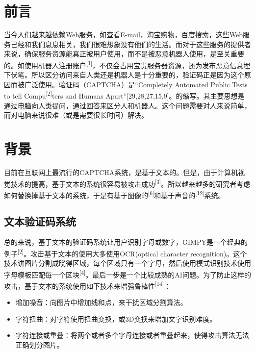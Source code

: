 \documentclass[bachelor,zhspacing]{cqu}  %
\begin{document}


\section{前言}\label{ux524dux8a00}

当今人们越来越依赖Web服务，如查看E-mail，淘宝购物，百度搜索，这些Web服务已经和我们息息相关，我们很难想象没有他们的生活。而对于这些服务的提供者来说，确保服务资源能真正被用户使用，而不是被恶意机器人使用，是至关重要的。如使用机器人注册账户\textsuperscript{{[}1{]}}，不仅会占用宝贵服务器资源，还为发布恶意信息埋下伏笔。所以区分访问来自人类还是机器人是十分重要的，验证码正是因为这个原因而被广泛使用。验证码（CAPTCHA）是``Completely
Automated Public Tests to tell Compu\textsuperscript{{[}2{]}}ters and
Humans
Apart''{[}29,28,27,15,9{]}。的缩写。其主要思想是通过电脑向人类提问，通过回答来区分人和机器人。这个问题需要对人来说简单，而对电脑来说很难（或是需要很长时间）解决。

\section{背景}\label{ux80ccux666f}

目前在互联网上最流行的CAPTCHA系统，是基于文本的。但是，由于计算机视觉技术的提高，基于文本的系统很容易被攻击成功\textsuperscript{{[}3{]}}。所以越来越多的研究者考虑如何替换掉基于文本的系统，于是有基于图像的\textsuperscript{{[}6{]}}和基于声音的\textsuperscript{{[}12{]}}系统。

\subsection{文本验证码系统}\label{ux6587ux672cux9a8cux8bc1ux7801ux7cfbux7edf}

总的来说，基于文本的验证码系统让用户识别字母或数字，GIMPY是一个经典的例子\textsuperscript{{[}2{]}}。攻击基于文本的使用大多使用OCR(optical
character
recognition)。这个技术讲图片分割成晓得区域，每个区域只有一个字母，然后使用模式识别技术使用字母模板匹配每一个区块\textsuperscript{{[}4{]}}。最后一步是一个比较成熟的AI问题。为了防止这样的攻击，基于文本的系统使用如下技术来增强鲁棒性\textsuperscript{{[}14{]}}：

\begin{itemize}
\tightlist
\item
  增加噪音：向图片中增加线和点，来干扰区域分割算法。
\item
  字符扭曲：对字符使用扭曲变换，或3D变换来增加文字识别难度。
\item
  字符连接或重叠：将两个或者多个字母连接或者重叠起来，使得攻击算法无法正确划分图片。
\end{itemize}
\end{document}
